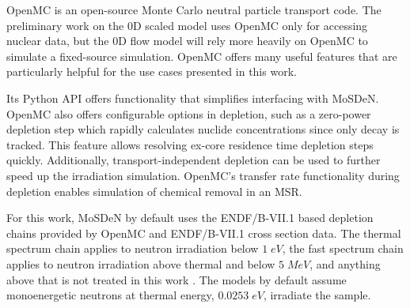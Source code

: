 OpenMC is an open-source Monte Carlo neutral particle transport code.
The preliminary work on the 0D scaled model uses OpenMC only for accessing nuclear data, but the 0D flow model will rely more heavily on OpenMC to simulate a fixed-source simulation.
OpenMC offers many useful features that are particularly helpful for the use cases presented in this work.

Its Python \gls{API} offers functionality that simplifies interfacing with \gls{MoSDeN}.
OpenMC also offers configurable options in depletion, such as a zero-power depletion step which rapidly calculates nuclide concentrations since only decay is tracked.
This feature allows resolving ex-core residence time depletion steps quickly.
Additionally, transport-independent depletion can be used to further speed up the irradiation simulation.
OpenMC’s transfer rate functionality during depletion enables simulation of chemical removal in an \gls{MSR}.

For this work, \gls{MoSDeN} by default uses the \gls{ENDF}/B-VII.1 based depletion chains provided by OpenMC and \gls{ENDF}/B-VII.1 cross section data.
The thermal spectrum chain applies to neutron irradiation below $1 \; eV$, the fast spectrum chain applies to neutron irradiation above thermal and below $5 \; MeV$, and anything above that is not treated in this work \cite{Spriggs2000Summary}.
The models by default assume monoenergetic neutrons at thermal energy, $0.0253 \; eV$, irradiate the sample.
